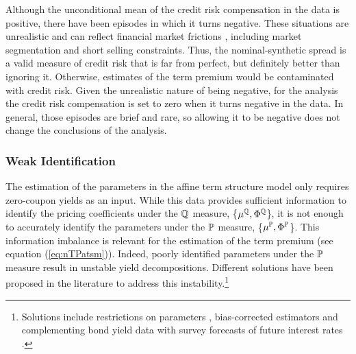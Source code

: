 {Although the unconditional mean of the credit risk compensation in the data is positive, there have been %
episodes in which it turns %
negative.
These situations are unrealistic and can reflect financial market frictions \citep{DuSchreger:2016JoF}, including market segmentation %
and short selling constraints.
Thus, the nominal-synthetic spread is a valid measure of credit risk that is far from perfect, but
definitely better than ignoring it. 
Otherwise, estimates of the term premium would be contaminated with credit risk.
Given the unrealistic nature of being negative, for the analysis the credit risk compensation is set to zero when %
it turns negative in the data. 
In general, those episodes are brief and rare, so allowing it to be negative does not change the conclusions of the analysis.


\subsubsection{Weak Identification} \label{sec:Identification}
\iftoggle{toclinks}{\gototoc}{} %

The estimation of the parameters in the affine term structure model only  requires zero-coupon yields as an input.
While this data provides sufficient information to identify 
the pricing coefficients under the \(\mathbb{Q}\) measure,
\{\(\mu^{\mathbb{Q}}, \Phi^{\mathbb{Q}}\)\}, it is not enough to accurately identify the parameters under the \(\mathbb{P}\) measure, %
\{\(\mu^{\mathbb{P}}, \Phi^{\mathbb{P}}\)\}. 
This information imbalance %
is relevant for the estimation of the term premium (see equation (\ref{eq:nTPatsm})). Indeed, poorly identified parameters under the \(\mathbb{P}\) measure result in unstable yield decompositions.
Different solutions have been proposed in the literature to address 
this instability.\footnote{ Solutions include restrictions on parameters \citep{Duffee:2010}, bias-corrected estimators \citep{BRW:2012} and complementing bond yield data with survey forecasts of future interest rates \citep{KimWright:2005,KimOrphanides:2012}.} 

}
